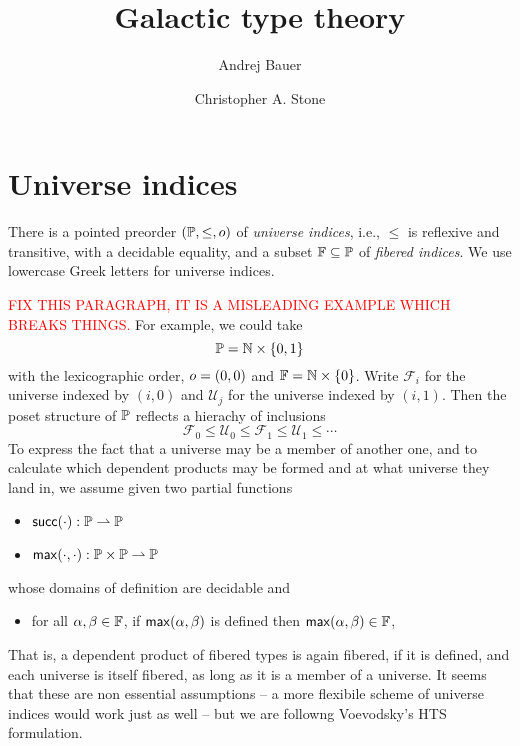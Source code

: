 \documentclass{article}
\begin{document}
\title{Galactic type theory}
\author{Andrej Bauer \and Christopher A. Stone}
\maketitle

\section{Universe indices}
\label{sec:universe-indices}

There is a pointed preorder $(\mathbb{P}, {\leq}, o)$ of \emph{universe indices}, i.e.,
$\leq$ is reflexive and transitive, with a decidable equality, and a subset $\mathbb{F} \subseteq
\mathbb{P}$ of \emph{fibered indices}. We use lowercase Greek letters for universe indices.

\textcolor{red}{FIX THIS PARAGRAPH, IT IS A MISLEADING EXAMPLE WHICH BREAKS THINGS.}
For example, we could take
%
\begin{equation*}
  \mathbb{P} = \mathbb{N} \times \{0,1\}
\end{equation*}
%
with the lexicographic order, $o = (0,0)$ and $\mathbb{F} = \mathbb{N} \times \{0\}$. Write
$\mathcal{F}_i$ for the universe indexed by $(i,0)$ and $\mathcal{U}_j$ for the universe
indexed by $(i,1)$. Then the poset structure of $\mathbb{P}$ reflects a hierachy of inclusions
%
\begin{equation*}
  \mathcal{F}_0 \leq
  \mathcal{U}_0 \leq
  \mathcal{F}_1 \leq
  \mathcal{U}_1 \leq
  \cdots
\end{equation*}
%
To express the fact that a universe may be a member of another one, and to calculate which
dependent products may be formed and at what universe they land in, we assume given two
partial functions
%
\begin{itemize}
  \item $\mathsf{succ}(\cdot)  : \mathbb{P} \rightharpoonup \mathbb{P}$
  \item $\mathsf{max}(\cdot,\cdot) : \mathbb{P} \times \mathbb{P} \rightharpoonup \mathbb{P}$
\end{itemize}
%
whose domains of definition are decidable and
%
\begin{itemize}
\item for all $\alpha, \beta \in \mathbb{F}$, if $\mathsf{max}(\alpha,\beta)$ is defined then
  $\mathsf{max}(\alpha,\beta) \in \mathbb{F}$,
\end{itemize}
%
That is, a dependent product of fibered types is again fibered, if it is defined, and each
universe is itself fibered, as long as it is a member of a universe. It seems that these
are non essential assumptions -- a more flexibile scheme of universe indices would work
just as well -- but we are followng Voevodsky's HTS formulation.
\end{document}
